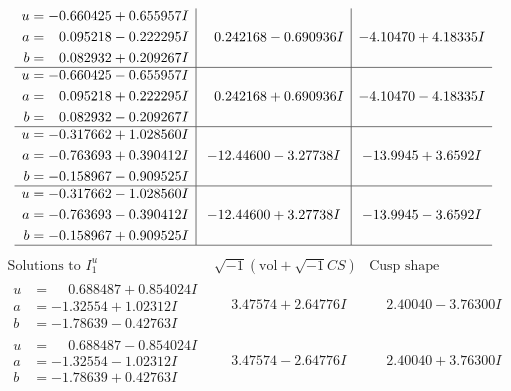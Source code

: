 \documentclass[1p]{elsarticle_modified}
\theoremstyle{definition}
\newcommand{\I}{\sqrt{-1}}
\begin{document}
$$\begin{array}{c|c|c}
\begin{aligned}
u &= -0.660425 + 0.655957 I \\
a &= \phantom{-}0.095218 - 0.222295 I \\
b &= \phantom{-}0.082932 + 0.209267 I\end{aligned}
 & \phantom{-}0.242168 - 0.690936 I & -4.10470 + 4.18335 I \\ \hline\begin{aligned}
u &= -0.660425 - 0.655957 I \\
a &= \phantom{-}0.095218 + 0.222295 I \\
b &= \phantom{-}0.082932 - 0.209267 I\end{aligned}
 & \phantom{-}0.242168 + 0.690936 I & -4.10470 - 4.18335 I \\ \hline\begin{aligned}
u &= -0.317662 + 1.028560 I \\
a &= -0.763693 + 0.390412 I \\
b &= -0.158967 - 0.909525 I\end{aligned}
 & -12.44600 - 3.27738 I & -13.9945 + 3.6592 I \\ \hline\begin{aligned}
u &= -0.317662 - 1.028560 I \\
a &= -0.763693 - 0.390412 I \\
b &= -0.158967 + 0.909525 I\end{aligned}
 & -12.44600 + 3.27738 I & -13.9945 - 3.6592 I\\
 \hline 
 \end{array}$$\newpage$$\begin{array}{c|c|c}  
\text{Solutions to }I^u_{1}& \I (\text{vol} + \sqrt{-1}CS) & \text{Cusp shape}\\
 \hline 
\begin{aligned}
u &= \phantom{-}0.688487 + 0.854024 I \\
a &= -1.32554 + 1.02312 I \\
b &= -1.78639 - 0.42763 I\end{aligned}
 & \phantom{-}3.47574 + 2.64776 I & \phantom{-}2.40040 - 3.76300 I \\ \hline\begin{aligned}
u &= \phantom{-}0.688487 - 0.854024 I \\
a &= -1.32554 - 1.02312 I \\
b &= -1.78639 + 0.42763 I\end{aligned}
 & \phantom{-}3.47574 - 2.64776 I & \phantom{-}2.40040 + 3.76300 I \\ \hline\begin{aligned}

\end{aligned}
\end{array}$$
\end{document}
